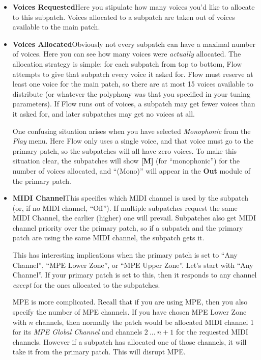 \documentclass{article}
\begin{document}
\begin{itemize}
\item {\bf Voices Requested}\quad Here you stipulate how many voices you'd like to allocate to this subpatch.  Voices allocated to a subpatch are taken out of voices available to the main patch. 

\item {\bf Voices Allocated}\quad Obviously not every subpatch can have a maximal number of voices.  Here you can see how many voices were {\it actually} allocated.  The allocation strategy is simple: for each subpatch from top to bottom, Flow attempts to give that subpatch every voice it asked for.  Flow must reserve at least one voice for the main patch, so there are at most 15 voices available to distribute (or whatever the polyphony was that you specified in your tuning parameters).  If Flow runs out of voices, a subpatch may get fewer voices than it asked for, and later subpatches may get no voices at all.  

One confusing situation arises when you have selected {\it Monophonic} from the {\it Play} menu.  Here Flow only uses a single voice, and that voice must go to the primary patch, so the subpatches will all have zero voices.  To make this situation clear, the subpatches will show {\bf [M]} (for ``monophonic'') for the number of voices allocated, and  ``(Mono)'' will appear in the {\bf Out} module of the primary patch.

\item {\bf MIDI Channel}\quad This specifies which MIDI channel is used by the subpatch (or, if no MIDI channel, ``Off'').  If multiple subpatches request the same MIDI Channel, the earlier (higher) one will prevail.    Subpatches also get MIDI channel priority over the primary patch, so if a subpatch and the primary patch are using the same MIDI channel, the subpatch gets it.

This has interesting implications when the primary patch is set to ``Any Channel'', ``MPE Lower Zone'', or ``MPE Upper Zone''.  Let's start with ``Any Channel''.  If your primary patch is set to this, then it responds to any channel {\it except} for the ones allocated to the subpatches.

MPE is more complicated.  Recall that if you are using MPE, then you also specify the number of MPE channels.  If you have chosen MPE Lower Zone with \(n\) channels, then normally the patch would be allocated MIDI channel 1 for its {\it MPE Global Channel} and channels \(2\ ...\ n + 1\) for the requested MIDI channels.  However if a subpatch has allocated one of those channels, it will take it from the primary patch.  This will disrupt MPE.


\end{itemize}
\end{document}
